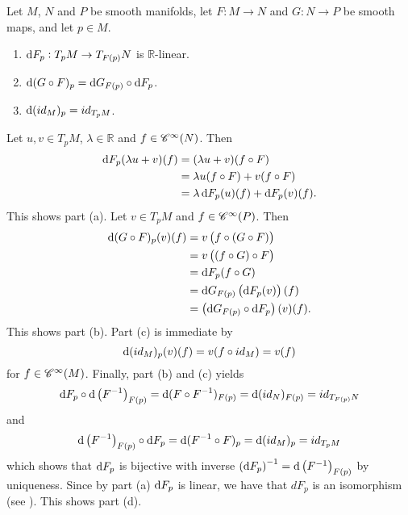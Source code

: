 \begin{exercise}
	Let $M$, $N$ and $P$ be smooth manifolds, let $F: M \to N$ and $G: N \to P$ be smooth maps, and let $p \in M$.
	\begin{enumerate}[label = (\alph*)]
		\item $\mathop{}\!\mathrm{d} F_p: T_pM \to T_{F(p)}N$ is $\mathbb{R}$-linear.
		\item $\mathop{}\!\mathrm{d} (G \circ F)_p = \mathop{}\!\mathrm{d} G_{F(p)} \circ \mathop{}\!\mathrm{d} F_p$.
		\item $\mathop{}\!\mathrm{d}(id_M)_p = id_{T_pM}$.
	\end{enumerate}
\end{exercise}

\begin{solution}
	Let $u,v \in T_pM$, $\lambda \in \mathbb{R}$ and $f \in \mathscr{C}^\infty(N)$. Then
	\begin{align*}
		\mathop{}\!\mathrm{d} F_p(\lambda u + v)(f) &= (\lambda u + v)(f \circ F)\\
		&= \lambda u(f \circ F) + v(f \circ F)\\
		&= \lambda\mathop{}\!\mathrm{d} F_p(u)(f) + \mathop{}\!\mathrm{d} F_p(v)(f).
	\end{align*}
	This shows part (a). Let $v \in T_pM$ and $f \in \mathscr{C}^\infty(P)$. Then
	\begin{align*}
		\d (G \circ F)_p(v)(f) &= v\del[1]{f \circ (G \circ F)}\\
		&= v\del[1]{(f \circ G) \circ F}\\
		&= \d F_p (f \circ G)\\
		&= \d G_{F(p)}\del[1]{\d F_p(v)}(f)\\
		&= \del[1]{\d G_{F(p)} \circ \d F_p}(v)(f).
	\end{align*}
	This shows part (b). Part (c) is immediate by
	\begin{equation*}
		\mathop{}\!\mathrm{d} (id_M)_p(v)(f) = v(f \circ id_M) = v(f)
	\end{equation*}
	\noindent for $f \in \mathscr{C}^\infty(M)$. Finally, part (b) and (c) yields
	\begin{equation*}
		\d F_p \circ \d \del[1]{F^{-1}}_{F(p)} = \d(F \circ F^{-1})_{F(p)} = \d(id_N)_{F(p)} = id_{T_{F(p)}N}
	\end{equation*}
	\noindent and
	\begin{equation*}
		\d \del[1]{F^{-1}}_{F(p)} \circ \d F_p = \d(F^{-1} \circ F)_p = \d (id_M)_p = id_{T_pM}
	\end{equation*}
	\noindent which shows that $\mathop{}\!\mathrm{d} F_p$ is bijective with inverse $\del[0]{\d F_p}^{-1} = \d \del[1]{F^{-1}}_{F(p)}$ by uniqueness. Since by part (a) $\mathop{}\!\mathrm{d} F_p$ is linear, we have that $dF_p$ is an isomorphism (see \cite[622]{lee:smooth_manifolds:2013}). This shows part (d).
\end{solution}
